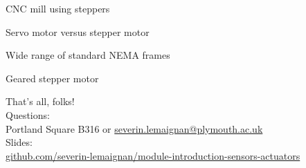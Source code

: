 \documentclass[compress]{beamer}
\begin{document}
{
    \begin{frame}{CNC mill using steppers}
    \end{frame}
}


{
    \begin{frame}{Servo motor versus stepper motor}
    \end{frame}
}

{
    \begin{frame}{Wide range of standard NEMA frames}
    \end{frame}
}

{
    \begin{frame}{Geared stepper motor}
    \end{frame}
}


\begin{frame}{}
    \begin{center}
        \Large
        That's all, folks!\\[2em]
        \normalsize
        Questions:\\
        Portland Square B316 or \url{severin.lemaignan@plymouth.ac.uk} \\[1em]

        Slides:\\
        \href{https://github.com/severin-lemaignan/module-introduction-sensors-actuators}{\small
        github.com/severin-lemaignan/module-introduction-sensors-actuators}


    \end{center}
\end{frame}
\end{document}
